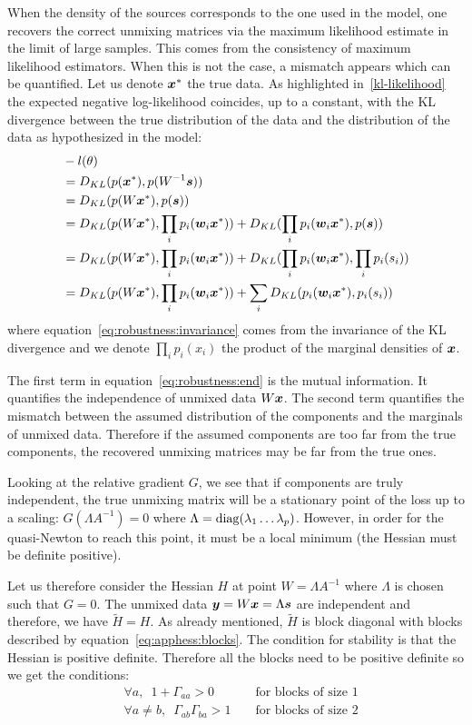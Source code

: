 When the density of the sources corresponds to the one used in the model, one
recovers the correct unmixing matrices via the maximum likelihood estimate in the
limit of large samples. This comes from the consistency of maximum likelihood
estimators.
When this is not the case, a mismatch appears which can be quantified. Let us
denote $\boldsymbol{x}^*$ the true data. As highlighted in~\eqref{kl-likelihood} the expected
negative log-likelihood coincides, up to a constant, with the KL divergence between the true
distribution of the data and the distribution of the data as hypothesized in the
model:
\begin{align}
  &-l(\theta) \\
  &=  D_{KL}(p(\boldsymbol{x}^*), p(W^{-1} \boldsymbol{s})) \\
             &=  D_{KL}(p(W\boldsymbol{x}^*), p(\boldsymbol{s})) \label{eq:robustness:invariance}\\
             &=  D_{KL}(p(W \boldsymbol{x}^*), \prod_i p_i(\boldsymbol{w}_i\boldsymbol{x}^*)) + D_{KL}(\prod_i p_i(\boldsymbol{w}_i\boldsymbol{x}^*), p(\boldsymbol{s})) \\
             &=  D_{KL}(p(W \boldsymbol{x}^*), \prod_i p_i(\boldsymbol{w}_i\boldsymbol{x}^*)) + D_{KL}(\prod_i p_i(\boldsymbol{w}_i\boldsymbol{x}^*), \prod_i p_i(s_i)) \\
  &=  D_{KL}(p(W \boldsymbol{x}^*), \prod_i p_i(\boldsymbol{w}_i\boldsymbol{x}^*)) + \sum_i D_{KL}(p_i(\boldsymbol{w}_i\boldsymbol{x}^*), p_i(s_i)) \label{eq:robustness:end}
\end{align}
where equation~\eqref{eq:robustness:invariance} comes from the invariance of the KL divergence and we
denote $\prod_i p_i(x_i)$ the product of the marginal densities of $\boldsymbol{x}$.

The first term in equation~\eqref{eq:robustness:end} is the mutual information. It quantifies the
independence of unmixed data $W \boldsymbol{x}$. The second term quantifies the mismatch
between the assumed distribution of the components and the marginals of unmixed data.
Therefore if the assumed components are too far from the true components, the
recovered unmixing matrices may be far from the true ones.


Looking at the relative gradient $G$, we see that if components are truly
independent, the true unmixing matrix will be a stationary point of the loss up
to a scaling: $G(\Lambda A^{-1})=0$ where $\Lambda=\operatorname*{diag}(\lambda_1 \dots \lambda_p)$.
However, in order for the quasi-Newton to reach this point, it must be a local
minimum (the Hessian must be definite positive). 

Let us therefore consider the Hessian $H$ at point $W = \Lambda A^{-1}$ where
$\Lambda$ is chosen such that $G = 0$. The unmixed data $\boldsymbol{y} = W \boldsymbol{x} = \Lambda \boldsymbol{s}$ are independent and
therefore, we have $\tilde{H} = H$.
As already mentioned, $\tilde{H}$ is block diagonal with blocks described by equation~\eqref{eq:apphess:blocks}.
The condition for stability is that the Hessian is positive definite. Therefore
all the blocks need to be positive definite so we get the conditions:
\begin{align}
  & \forall a, \enspace 1 + \Gamma_{aa} > 0 && \text{ for blocks of size } 1 \\
  & \forall a \neq b, \enspace \Gamma_{ab}\Gamma_{ba} > 1 && \text{ for blocks of size } 2
\end{align}

